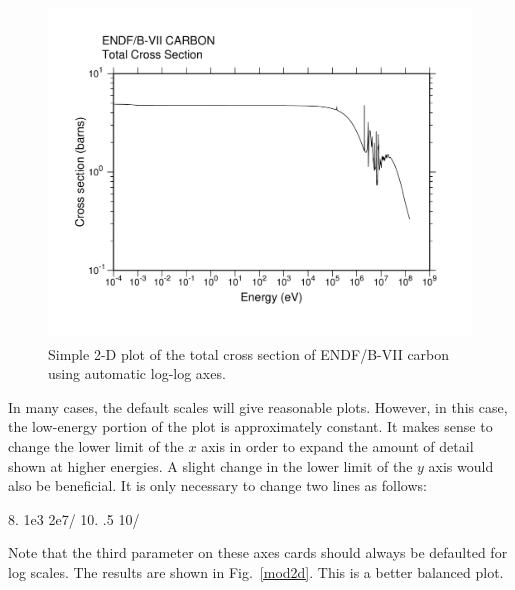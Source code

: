 \begin{figure}[thb]\centering
\includegraphics[keepaspectratio, height=3.5in, angle=0]{figs/plotr1ack}
\caption[Sample 2-D plot with default axes]{Simple 2-D plot of the
 total cross section of ENDF/B-VII carbon using automatic log-log axes.}
\label{def2d}
\end{figure}

In many cases, the default scales will give reasonable plots.
However, in this case, the low-energy portion of the plot is
approximately constant. It makes sense to change the lower limit of
the $x$ axis in order to expand the amount of detail shown at higher
energies.  A slight change in the lower limit of the $y$ axis would
also be beneficial.  It is only necessary to change two lines as
follows:

\small
\begin{ccode}

  8.  1e3 2e7/
 10.  .5 10/

\end{ccode}
\normalsize

\noindent
Note that the third parameter on these axes cards should always be
defaulted for log scales.  The results are shown in Fig.~\ref{mod2d}.
This is a better balanced plot.

